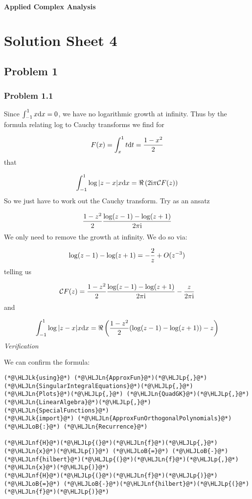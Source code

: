 \documentclass[12pt,landscape]{article}
\newcommand{\HLJLk}[1]{\textcolor[RGB]{148,91,176}{\textbf{#1}}}
\newcommand{\HLJLn}[1]{#1}
\newcommand{\HLJLnf}[1]{\textcolor[RGB]{66,102,213}{#1}}
\newcommand{\HLJLoB}[1]{\textcolor[RGB]{102,102,102}{\textbf{#1}}}
\newcommand{\HLJLp}[1]{#1}
\def\D{ {\rm d} }
\def\I{ {\rm i} }
\def\CC{ {\cal C} }
\def\dx{\D x}
\def\dt{\D t}
\def\pr(#1){\left({#1}\right)}
\begin{document}
{\LARGE
\sf
\textbf{Applied Complex Analysis}

\section{Solution Sheet 4}
\subsection{Problem 1}
\subsubsection{Problem 1.1}
Since $\int_{-1}^1 x \dx = 0$, we have no logarithmic growth at infinity. Thus by the formula relating log to Cauchy transforms we find for

\[
F(x) = \int_x^1 t \dt = {1 - x^2 \over 2}
\]
that

\[
\int_{-1}^1 \log|z-x| x \dx = \Re\pr({2 \I \pi \CC F(z)})
\]
So we just have to work out the Cauchy transform. Try as an ansatz

\[
{1 - z^2 \over 2} {\log(z-1) - \log(z+1) \over 2 \pi \I}
\]
We only need to remove the growth at infinity. We do so via:

\[
\log(z-1) - \log(z+1)  = -{2 \over z} + O(z^{-3})
\]
telling us

\[
\CC F(z) = {1 - z^2 \over 2} {\log(z-1) - \log(z+1)  \over 2 \pi \I} - {z \over 2 \pi \I}
\]
and

\[
\int_{-1}^1 \log|z-x| x \dx = \Re \left({1 - z^2 \over 2} (\log(z-1) - \log(z+1)) - z \right)
\]
\emph{Verification}

We can confirm the formula:


\begin{lstlisting}
(*@\HLJLk{using}@*) (*@\HLJLn{ApproxFun}@*)(*@\HLJLp{,}@*) (*@\HLJLn{SingularIntegralEquations}@*)(*@\HLJLp{,}@*) (*@\HLJLn{Plots}@*)(*@\HLJLp{,}@*) (*@\HLJLn{QuadGK}@*)(*@\HLJLp{,}@*) (*@\HLJLn{LinearAlgebra}@*)(*@\HLJLp{,}@*) (*@\HLJLn{SpecialFunctions}@*)
(*@\HLJLk{import}@*) (*@\HLJLn{ApproxFunOrthogonalPolynomials}@*)(*@\HLJLoB{:}@*) (*@\HLJLn{Recurrence}@*)

(*@\HLJLnf{H}@*)(*@\HLJLp{(}@*)(*@\HLJLn{f}@*)(*@\HLJLp{,}@*)(*@\HLJLn{x}@*)(*@\HLJLp{)}@*) (*@\HLJLoB{=}@*) (*@\HLJLoB{-}@*)(*@\HLJLnf{hilbert}@*)(*@\HLJLp{(}@*)(*@\HLJLn{f}@*)(*@\HLJLp{,}@*)(*@\HLJLn{x}@*)(*@\HLJLp{)}@*)
(*@\HLJLnf{H}@*)(*@\HLJLp{(}@*)(*@\HLJLn{f}@*)(*@\HLJLp{)}@*) (*@\HLJLoB{=}@*) (*@\HLJLoB{-}@*)(*@\HLJLnf{hilbert}@*)(*@\HLJLp{(}@*)(*@\HLJLn{f}@*)(*@\HLJLp{)}@*)


\end{lstlisting}}
\end{document}
